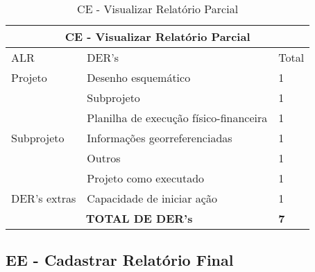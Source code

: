   \begin{table}[!h]
\centering
\caption{CE - Visualizar Relatório Parcial}
\label{ce_visualizar_relatorio_parcial}
\begin{tabular}{|l|l|l|}
\hline
\multicolumn{3}{|c|}{CE - Visualizar Relatório Parcial}                                                                 \\ \hline
ALR                           & DER's                                                & Total              \\ \hline
		Projeto	      & Desenho esquemático                                  & 1                  \\ \hline
\multirow{5}{*}{Subprojeto}   & Subprojeto                                           & 1                  \\ \cline{2-3} 
                              & Planilha de execução físico-financeira               & 1                  \\ \cline{2-3} 
                              & Informações georreferenciadas                        & 1                  \\ \cline{2-3} 
                              & Outros                                               & 1                  \\ \cline{2-3} 
                              & Projeto como executado                               & 1                  \\ \hline
DER's extras		      & Capacidade de iniciar ação                           & 1 \\ \hline
\multicolumn{2}{|c|}{\textbf{TOTAL DE DER's}}                                                 & \textbf{7}                 \\ \hline
\end{tabular}
\end{table}

  \subsection{EE - Cadastrar Relatório Final}
  
